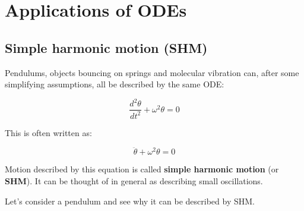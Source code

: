 \section{Applications of ODEs}
\subsection{Simple harmonic motion (SHM)}
Pendulums, objects bouncing on springs and molecular vibration can, after some simplifying assumptions, all be described by the same ODE:

\[\frac{d^2\theta}{dt^2} + \omega^2\theta = 0\]

This is often written as:

\[\ddot\theta + \omega^2\theta = 0\]

Motion described by this equation is called \textbf{simple harmonic motion} (or \textbf{SHM}). It can be thought of in general as describing small oscillations.

Let's consider a pendulum and see why it can be described by SHM.

